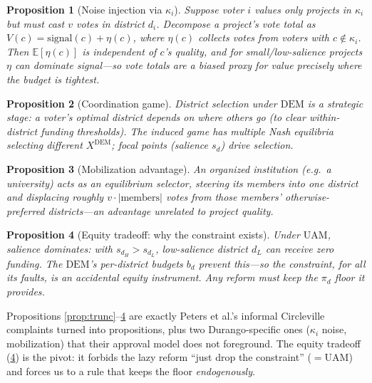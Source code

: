 \documentclass[11pt,letterpaper]{article}
\theoremstyle{definition}
\theoremstyle{plain}
\newtheorem{proposition}{Proposition}[section]
\theoremstyle{remark}
\newcommand{\E}{\mathbb{E}}
\newcommand{\budget}{b}            %
\newcommand{\votes}{v}             %
\newcommand{\popshare}{\pi}        %
\newcommand{\DEM}{\mathrm{DEM}}
\newcommand{\UAM}{\mathrm{UAM}}
\begin{document}
\begin{proposition}[Noise injection via $\kappa_i$]
\label{prop:noise}
Suppose voter $i$ values only projects in $\kappa_i$ but must cast $\votes$ votes in district
$d_i$. Decompose a project's vote total as $V(c)=\text{signal}(c)+\eta(c)$, where $\eta(c)$
collects votes from voters with $c\notin\kappa_i$. Then $\E[\eta(c)]$ is independent of $c$'s
quality, and for small/low-salience projects $\eta$ can dominate signal---so vote totals are a
biased proxy for value precisely where the budget is tightest.
\end{proposition}

\begin{proposition}[Coordination game]
\label{prop:coord}
District \emph{selection} under $\DEM$ is a strategic stage: a voter's optimal district depends on
where others go (to clear within-district funding thresholds). The induced game has multiple Nash
equilibria selecting different $X^{\DEM}$; focal points (salience $s_d$) drive selection.
\end{proposition}

\begin{proposition}[Mobilization advantage]
\label{prop:mob}
An organized institution (e.g.\ a university) acts as an equilibrium selector, steering its members
into one district and displacing roughly $\votes\cdot|\text{members}|$ votes from those members'
otherwise-preferred districts---an advantage unrelated to project quality.
\end{proposition}

\begin{proposition}[Equity tradeoff: why the constraint exists]
\label{prop:equity}
Under $\UAM$, salience dominates: with $s_{d_H}>s_{d_L}$, low-salience district $d_L$ can receive
\emph{zero} funding. The $\DEM$'s per-district budgets $\budget_d$ prevent this---so the
constraint, for all its faults, is an \emph{accidental equity instrument}. Any reform must keep the
$\popshare_d$ floor it provides.
\end{proposition}

\begin{connection}
Propositions \ref{prop:trunc}--\ref{prop:equity} are exactly Peters et al.'s informal Circleville
complaints turned into propositions, plus two Durango-specific ones ($\kappa_i$ noise, mobilization)
that their approval model does not foreground. The equity tradeoff (\ref{prop:equity}) is the pivot:
it forbids the lazy reform ``just drop the constraint'' ($=\UAM$) and forces us to a rule that keeps
the floor \emph{endogenously}.
\end{connection}
\end{document}
